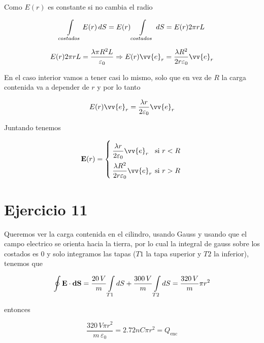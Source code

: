 \documentclass[leqno, 12pt, twoside, letterpaper]{book}
\def\efield{\textbf{E}}
\def\vdiff{\textbf{dS}}
\begin{document}
Como $E(r)$ es constante si no cambia el radio

\[ \int\displaylimits_{costados} E(r) \, dS = E(r) \int\displaylimits_{costados}  \, dS = E(r) 2 \pi r L\]

\[ E(r) 2 \pi r L = \dfrac{\lambda\pi R^2 L}{\varepsilon_0} \Rightarrow  E(r) \vv{e}_r = \dfrac{\lambda R^2 }{2 r \varepsilon_0} \vv{e}_r\]

En el caso interior vamos a tener casi lo mismo, solo que en vez de $R$ la carga contenida va a depender de $r$ y por lo tanto 

\[ E(r) \vv{e}_r = \dfrac{\lambda r }{2 \varepsilon_0} \vv{e}_r\]

Juntando tenemos

\begin{exbox}
$$ \efield(r) = \twopartdef{\dfrac{\lambda r }{2 \varepsilon_0} \vv{e}_r}{ r < R }{\dfrac{\lambda R^2 }{2 r \varepsilon_0} \vv{e}_r}{\textrm{si } r > R} $$
\end{exbox}

\section*{Ejercicio 11} 

Queremos ver la carga contenida en el cilindro, usando Gauss y usando que el campo electrico se orienta hacia la tierra, por lo cual la integral de gauss sobre los costados es 0 y solo integramos las tapas ($T1$ la tapa superior y $T2$ la inferior), tenemos que

\[ \oint \efield \cdot \vdiff = \dfrac{20 \, V}{m} \int\displaylimits_{T1} dS +  \dfrac{300 \,V}{m}\int\displaylimits_{T2} dS = \dfrac{320 \, V}{m} \pi r^2 \]

entonces
 
$$  \dfrac{320 \, V \pi r^2 }{m \, \varepsilon_0} = 2.72nC \pi r^2 =  Q_{\textrm{enc}} $$
\end{document}
